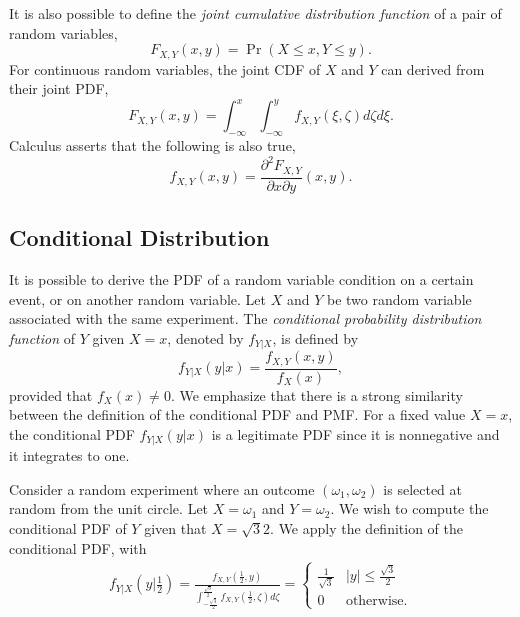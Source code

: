 It is also possible to define the \emph{joint cumulative distribution function} of a pair of random variables, 
\begin{equation*}
F_{X,Y} (x,y) = \Pr (X \leq x, Y \leq y) .
\end{equation*}
For continuous random variables, the joint CDF of $X$ and $Y$ can derived from their joint PDF,
\begin{equation*}
F_{X,Y} (x,y) = \int_{-\infty}^x \int_{-\infty}^y f_{X,Y} (\xi,\zeta) d\zeta d\xi .
\end{equation*}
Calculus asserts that the following is also true,
\begin{equation*}
f_{X,Y} (x,y) = \frac{\partial^2 F_{X,Y}}{\partial x \partial y} (x,y) .
\end{equation*}


\subsection{Conditional Distribution}

It is possible to derive the PDF of a random variable condition on a certain event, or on another random variable.
Let $X$ and $Y$ be two random variable associated with the same experiment.
The \emph{conditional probability distribution function} of $Y$ given $X = x$, denoted by $f_{Y|X}$, is defined by
\begin{equation} \label{equation:ContinuousConditonalPDF}
f_{Y|X} (y|x) = \frac{f_{X,Y} (x,y)}{f_X(x)},
\end{equation}
provided that $f_X(x) \neq 0$.
We emphasize that there is a strong similarity between the definition of the conditional PDF and PMF.
For a fixed value $X = x$, the conditional PDF $f_{Y|X} (y|x)$ is a legitimate PDF since it is nonnegative and it integrates to one.

\begin{example}
Consider a random experiment where an outcome $(\omega_1, \omega_2)$ is selected at random from the unit circle.
Let $X = \omega_1$ and $Y = \omega_2$.
We wish to compute the conditional PDF of $Y$ given that $X = \sqrt{3}{2}$.
We apply the definition of the conditional PDF, with
\begin{equation*}
\begin{split}
f_{Y|X} \left( y \Big| \frac{1}{2} \right)
= \frac{f_{X,Y} \left( \frac{1}{2}, y \right)}
{\int_{-\frac{\sqrt{3}}{2}}^{\frac{\sqrt{3}}{2}}
f_{X,Y} \left( \frac{1}{2} , \zeta \right) d \zeta }
= \begin{cases} \frac{1}{\sqrt{3}} & |y| \leq \frac{\sqrt{3}}{2} \\
0 & \text{otherwise} . \end{cases}
\end{split}
\end{equation*}
\end{example}

